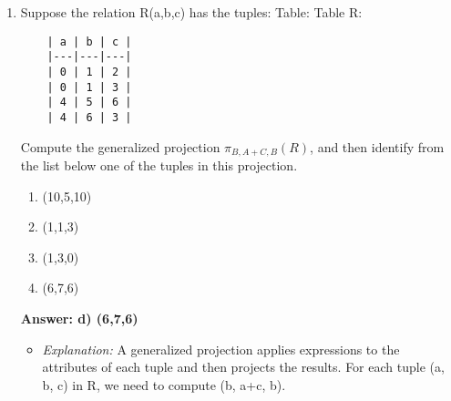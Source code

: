 \documentclass{article}
\begin{document}
\begin{enumerate}[label=\textbf{Question \arabic*.}]
\item Suppose the relation R(a,b,c) has the tuples:
    Table:
    Table R:
    \begin{verbatim}
    | a | b | c |
    |---|---|---|
    | 0 | 1 | 2 |
    | 0 | 1 | 3 |
    | 4 | 5 | 6 |
    | 4 | 6 | 3 |
    \end{verbatim}
    Compute the generalized projection $\pi_{B,A+C,B}(R)$, and then identify from the list below one of the tuples in this projection.
    \begin{enumerate}[label=\alph*)]
        \item (10,5,10)
        \item (1,1,3)
        \item (1,3,0)
        \item (6,7,6)
    \end{enumerate}
    \textbf{Answer: d) (6,7,6)}
    \begin{itemize}
        \item \textit{Explanation:} A generalized projection applies expressions to the attributes of each tuple and then projects the results.
        For each tuple (a, b, c) in R, we need to compute (b, a+c, b).


\end{itemize}
\end{enumerate}
\end{document}
